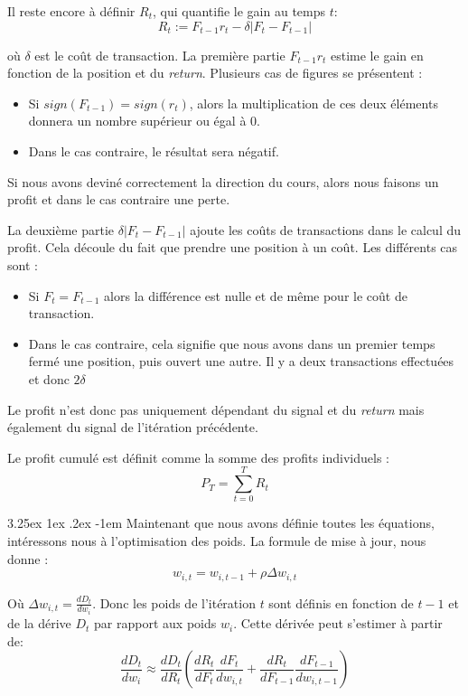 \documentclass[a4paper, 11pt]{article}
\makeatletter
\renewcommand\paragraph{\@startsection{paragraph}{5}{\z@}%
  {3.25ex \@plus1ex \@minus.2ex}%
  {-1em}%
  {\normalfont\normalsize\bfseries}}
\makeatother
\begin{document}
Il reste encore à définir $R_t$, qui quantifie le gain au temps $t$:
$$R_t := F_{t-1} r_t - \delta |F_t - F_{t-1}|$$

où $\delta$ est le coût de transaction.
La première partie $F_{t-1} r_t$ estime le gain en fonction de la position et du \textit{return}. Plusieurs cas de figures se présentent :
\begin{itemize}
 \item Si $sign(F_{t-1}) = sign(r_t)$, alors la multiplication de ces deux éléments donnera un nombre supérieur ou égal à 0.
 \item Dans le cas contraire, le résultat sera négatif.
\end{itemize}
Si nous avons deviné correctement la direction du cours, alors nous faisons un profit et dans le cas contraire une perte.

La deuxième partie $\delta |F_t - F_{t-1}|$ ajoute les coûts de transactions dans le calcul du profit. Cela découle du fait que prendre une position à
un coût. Les différents cas sont :
\begin{itemize}
 \item Si $F_t = F_{t-1}$ alors la différence est nulle et de même pour le coût de transaction.
 \item Dans le cas contraire, cela signifie que nous avons dans un premier temps fermé une position, puis ouvert une autre. Il y a deux transactions
 effectuées et donc $2 \delta$
\end{itemize}
Le profit n'est donc pas uniquement dépendant du signal et du \textit{return} mais également du signal de l'itération précédente.

Le profit cumulé est définit comme la somme des profits individuels :
$$P_T = \sum_{t=0}^T R_t$$

\paragraph{}
Maintenant que nous avons définie toutes les équations, intéressons nous à l'optimisation des poids. La formule de mise à jour, nous donne :
$$w_{i,t} = w_{i,t-1} + \rho \Delta w_{i,t}$$

Où $\Delta w_{i,t} = \frac{dD_t}{dw_i}$. Donc les poids de l'itération $t$ sont définis en fonction de $t-1$ et de la dérive $D_t$ par rapport aux poids
$w_i$. Cette dérivée peut s'estimer à partir de:
$$\frac{dD_t}{dw_i} \approx \frac{dD_t}{dR_t} (\frac{dR_t}{dF_t} \frac{dF_t}{dw_{i,t}} + \frac{dR_t}{dF_{t-1}} \frac{dF_{t-1}}{dw_{i,t-1}})$$
\end{document}
